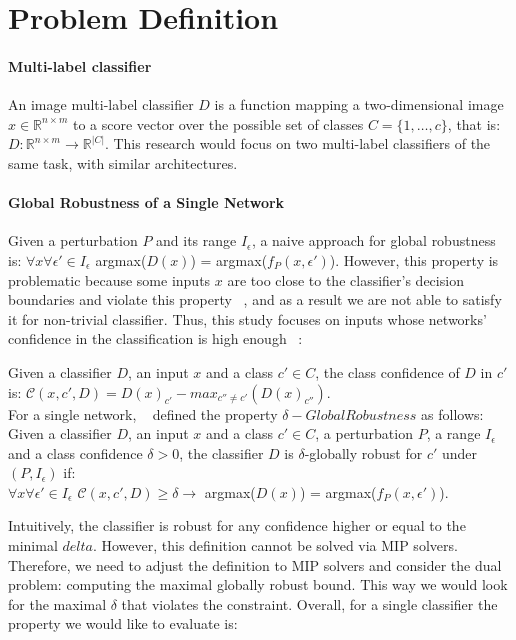 
\section{Problem Definition}

\sloppy
\paragraph{Multi-label classifier}
An image multi-label classifier $D$ is a function mapping a two-dimensional image $x\in \mathbb{R}^{n \times m}$ to a score vector over the possible set of classes $C=\{1,\ldots,c\}$, that is:
$D: \mathbb{R}^{n \times m} \rightarrow {\mathbb{R}}^{|C|}$.
This research would focus on two multi-label classifiers of the same task, with similar architectures.


\paragraph{Global Robustness of a Single Network}
Given a perturbation $P$ and its range $I_\epsilon$, a naive approach for global robustness is:
$\forall{x}\forall{\epsilon'}\in{I_\epsilon}$  argmax($D(x)$) = argmax($f_P(x,\epsilon')$).
However, this property is problematic because some inputs $x$ are too close to the classifier's decision boundaries and violate this property ~\cite{DECISIONBOUND}, and as a result we are not able to satisfy it for non-trivial classifier. Thus, this study focuses on inputs whose networks' confidence in the classification is high enough ~\cite{VHAGAR}:

Given a classifier $D$, an input $x$ and a class $c'\in{C}$, the class confidence of $D$ in $c'$ is:
$\mathcal{C}(x,c',D)=D(x)_{c'}-max_{c''\ne c'}(D(x)_{c''})$.\\
For a single network, ~\cite{VHAGAR} defined the property $\delta-Global Robustness$ as follows:\\
Given a classifier $D$, an input $x$ and a class $c'\in{C}$, a perturbation $P$, a range $I_\epsilon$ and a class confidence $\delta>0$, the classifier $D$ is $\delta$-globally robust for $c'$ under $(P,I_\epsilon)$ if:\\
$\forall{x}\forall{\epsilon'}\in{I_\epsilon}$ $\mathcal{C}(x,c',D) \geq \delta \rightarrow$ argmax($D(x)$) = argmax($f_P(x,\epsilon')$).

Intuitively, the classifier is robust for any confidence higher or equal to the minimal $delta$. However, this definition cannot be solved via MIP solvers. Therefore, we need to adjust the definition to MIP solvers and consider the dual problem: computing the maximal globally robust bound. This way we would look for the maximal $\delta$ that violates the constraint. Overall, for a single classifier the property we would like to evaluate is:

